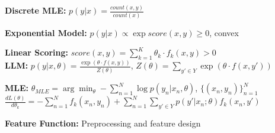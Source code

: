 \textbf{Discrete MLE:} $p(y|x) = \frac{count(x,y)}{count(x)}$\\
\begin{comment}
	Shortcomings: Very limited model. Can't interpolate from sparse training data, e.g. if an x,y doesn't show up, it is assumed to be an impossible combination.\\
\end{comment} 

\textbf{Exponential Model:} $p(y|x) \propto \exp score(x,y) \geq 0$, convex\\
\begin{comment}
	Exponentiation ensures non-negativity\\
\end{comment} 

\textbf{Linear Scoring:} $score(x,y) = \sum^K_{k=1}\theta_k \cdot f_k(x,y) > 0$\\

\textbf{LLM:} $p(y|x,\theta) = \frac{\exp (\theta \cdot f(x,y))}{Z(\theta)}$, $Z(\theta) = \sum_{y' \in Y} \exp (\theta \cdot f(x,y'))$\\
\begin{comment}
	Taking the log of this model makes it linear: $\log p(y|x,\theta) = \theta \cdot f(x,y) + const$.
	The normalisation constant is not always tractable and computed in $O(|Y|)$. \\
\end{comment} 

\textbf{MLE:} $\theta_{MLE} = \arg \min_{\theta} -\sum_{n=1}^N \log p(y_n|x_n, \theta)$, $\{(x_n, y_n)\}^N_{n=1}$\\
$\frac{dL(\theta)}{d\theta_k} = -\sum_{n=1}^N f_k(x_n, y_n) + \sum_{n=1}^N \sum_{y'\in Y} p(y'| x_n;\theta)f_k(x_n, y')$ \\
\begin{comment}
	The exponential function is convex, which leads to a global optimum.\\	
	The first part of the gradient describes the observed feature counts, whereas the second part describes the expected feature counts. We want them to be the same $\Rightarrow$ Expectation matching.
	This function is easily derived by plugging in the exponential model into the loss function.\\
\end{comment} 

\textbf{Feature Function:} Preprocessing and feature design\\
\begin{comment}
	Preprocessing converts raw text into a form that makes feature design easy, f.e: Tokenization, Lower casing, stemming, Stop-word removal.\\
	Feature designs: n-grams, One-Hot, Bag of words, word-embeddings, Domain-specific features.\\
\end{comment}


